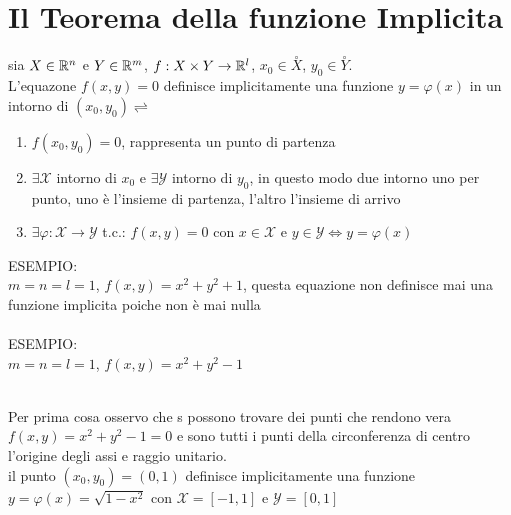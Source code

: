 \section{Il Teorema della funzione Implicita}
sia $X\in \mathbb{R}^n$ e $Y\in \mathbb{R}^m$, $f:X\times Y\to \mathbb{\mathbb{R}}^l$, $x_0\in \overset{\circ}{X}$, $y_0\in \overset{\circ}{Y}$.\\
L'equazone $f(x,y)=0$ definisce implicitamente una funzione $y=\varphi(x)$ in un intorno di $(x_0,y_0) \rightleftharpoons$
\begin{enumerate}
	\item $f(x_0,y_0)=0$, rappresenta un punto di partenza 
	\item $\exists \mathcal{X}$ intorno di $x_0$ e $\exists \mathcal{Y}$ intorno di $y_0$, in questo modo due intorno uno per punto, uno è l'insieme di partenza, l'altro l'insieme di arrivo
	\item $\exists\varphi:\mathcal{X}\rightarrow\mathcal{Y}$ t.c.: $f(x,y)=0$ con $x\in\mathcal{X}$ e $y\in\mathcal{Y} \Leftrightarrow y=\varphi(x)$
\end{enumerate}
ESEMPIO:\\
$m=n=l=1$, $f(x,y)=x^2+y^2+1$, questa equazione non definisce mai una funzione implicita poiche non è mai nulla\\
\\
ESEMPIO:\\
$m=n=l=1$, $f(x,y)=x^2+y^2-1$\\
	\\
	Per prima cosa osservo che s possono trovare dei punti che rendono vera $f(x,y)=x^2+y^2-1=0$ e sono tutti i punti della circonferenza di centro l'origine degli assi e raggio unitario.\\
	il punto $(x_0,y_0)=(0,1)$ definisce implicitamente una funzione $y=\varphi(x)=\sqrt{1-x^2}$ con $\mathcal{X}=[-1,1]$ e $\mathcal{Y}=[0,1]$\\

